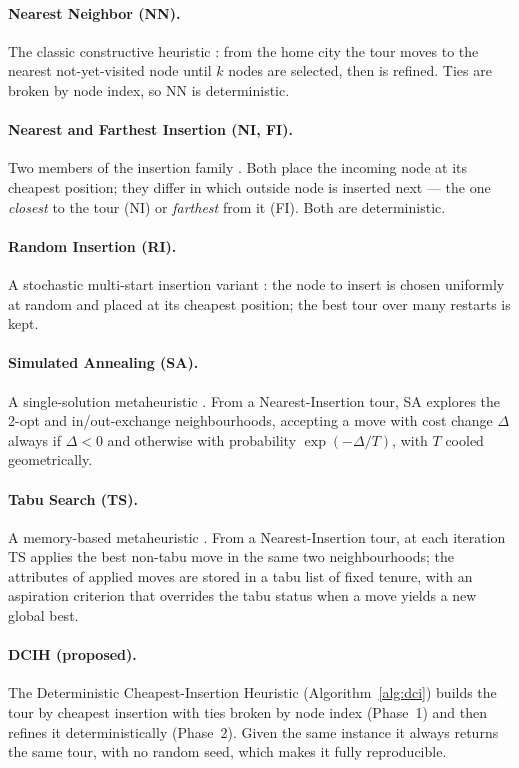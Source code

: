 \paragraph{Nearest Neighbor (NN).} The classic constructive heuristic
\citep{rosenkrantz1977}: from the home city the tour moves to the nearest
not-yet-visited node until $k$ nodes are selected, then is refined. Ties are broken
by node index, so NN is deterministic.

\paragraph{Nearest and Farthest Insertion (NI, FI).} Two members of the insertion
family \citep{rosenkrantz1977,bentley1992}. Both place the incoming node at its
cheapest position; they differ in which outside node is inserted next --- the one
\emph{closest} to the tour (NI) or \emph{farthest} from it (FI). Both are
deterministic.

\paragraph{Random Insertion (RI).} A stochastic multi-start insertion variant
\citep{rosenkrantz1977}: the node to insert is chosen uniformly at random and
placed at its cheapest position; the best tour over many restarts is kept.

\paragraph{Simulated Annealing (SA).} A single-solution metaheuristic
\citep{kirkpatrick1983,cerny1985}. From a Nearest-Insertion tour, SA explores the
2-opt and in/out-exchange neighbourhoods, accepting a move with cost change
$\Delta$ always if $\Delta<0$ and otherwise with probability $\exp(-\Delta/T)$,
with $T$ cooled geometrically.

\paragraph{Tabu Search (TS).} A memory-based metaheuristic
\citep{glover1986,gloverlaguna1997,knox1994}. From a Nearest-Insertion tour, at
each iteration TS applies the best non-tabu move in the same two neighbourhoods;
the attributes of applied moves are stored in a tabu list of fixed tenure, with an
aspiration criterion that overrides the tabu status when a move yields a new global
best.

\paragraph{DCIH (proposed).} The Deterministic Cheapest-Insertion Heuristic
(Algorithm~\ref{alg:dci}) builds the tour by cheapest insertion with ties broken by
node index (Phase~1) and then refines it deterministically (Phase~2). Given the same
instance it always returns the same tour, with no random seed, which makes it fully
reproducible.

